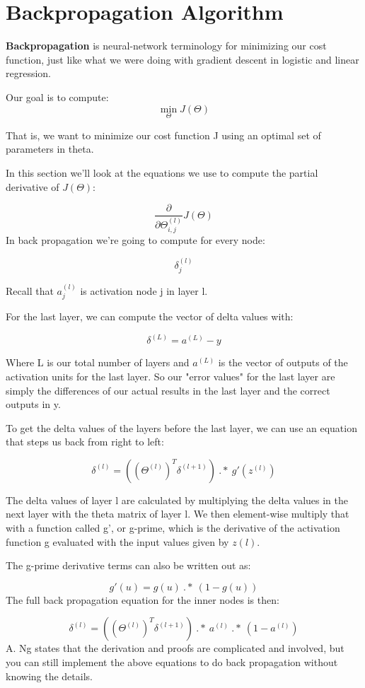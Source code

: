 \section{Backpropagation Algorithm}
\textbf{Backpropagation} is neural-network terminology for minimizing our cost function, just like what we were doing with gradient descent in logistic and linear regression.

Our goal is to compute: $$ \min_\Theta J(\Theta) $$

That is, we want to minimize our cost function J using an optimal set of parameters in theta.

In this section we'll look at the equations we use to compute the partial derivative of $J(\Theta)$:

$$\dfrac{\partial}{\partial \Theta_{i,j}^{(l)}}J(\Theta) $$
In back propagation we're going to compute for every node:

$$\delta_j^{(l)}$$

Recall that $a_j^{(l)}$ is activation node j in layer l.

For the last layer, we can compute the vector of delta values with:

$$\delta^{(L)} = a^{(L)} - y$$

Where L is our total number of layers and $a^{(L)}$ is the vector of outputs of the activation units for the last layer. So our "error values" for the last layer are simply the differences of our actual results in the last layer and the correct outputs in y.

To get the delta values of the layers before the last layer, we can use an equation that steps us back from right to left:

$$\delta^{(l)} = ((\Theta^{(l)})^T \delta^{(l+1)})\ .*\ g'(z^{(l)})$$

The delta values of layer l are calculated by multiplying the delta values in the next layer with the theta matrix of layer l. We then element-wise multiply that with a function called g', or g-prime, which is the derivative of the activation function g evaluated with the input values given by $z(l)$.

The g-prime derivative terms can also be written out as:

$$g'(u) = g(u)\ .*\ (1 - g(u))$$
The full back propagation equation for the inner nodes is then:

$$\delta^{(l)} = ((\Theta^{(l)})^T \delta^{(l+1)})\ .*\ a^{(l)}\ .*\ (1 - a^{(l)})$$
A. Ng states that the derivation and proofs are complicated and involved, but you can still implement the above equations to do back propagation without knowing the details.

